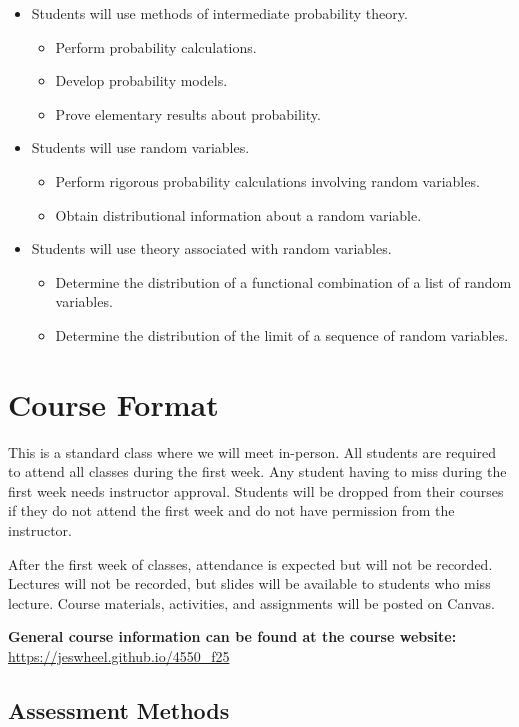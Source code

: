 \documentclass[11pt]{article}\usepackage[]{graphicx}\usepackage[]{xcolor}
\begin{document}
\begin{itemize}
  \item Students will use methods of intermediate probability theory.
  \begin{itemize}
    \item Perform probability calculations.
    \item Develop probability models.
    \item Prove elementary results about probability.
  \end{itemize}
  \item Students will use random variables.
  \begin{itemize}
    \item Perform rigorous probability calculations involving random variables.
    \item Obtain distributional information about a random variable.
  \end{itemize}
  \item Students will use theory associated with random variables.
  \begin{itemize}
    \item Determine the distribution of a functional combination of a list of random variables.
    \item Determine the distribution of the limit of a sequence of random variables.
  \end{itemize}
\end{itemize}

\section{Course Format}

This is a standard class where we will meet in-person.
All students are required to attend all classes during the first week. 
Any student having to miss during the first week needs instructor approval. 
Students will be dropped from their courses if they do not attend the first week and do not have permission from the instructor.

After the first week of classes, attendance is expected but will not be recorded.
Lectures will not be recorded, but slides will be available to students who miss lecture.
Course materials, activities, and assignments will be posted on Canvas.

\textbf{General course information can be found at the course website:} \url{https://jeswheel.github.io/4550\_f25}

\subsection{Assessment Methods}
\end{document}
